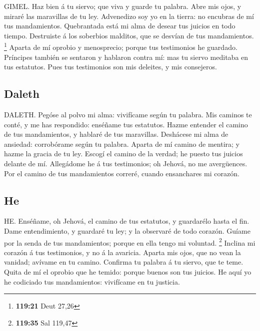  GIMEL. Haz bien á tu siervo; que viva y guarde tu palabra.
 Abre mis ojos, y miraré las maravillas de tu ley.
 Advenedizo soy yo en la tierra: no encubras de mí tus
mandamientos.  Quebrantada está mi alma de desear tus
juicios en todo tiempo.  Destruiste á los soberbios
malditos, que se desvían de tus mandamientos. \footnote{\textbf{119:21}
  Deut 27,26}  Aparta de mí oprobio y menosprecio; porque
tus testimonios he guardado.  Príncipes también se sentaron
y hablaron contra mí: mas tu siervo meditaba en tus estatutos.
 Pues tus testimonios son mis deleites, y mis consejeros.

\hypertarget{daleth}{%
\subsection{Daleth}\label{daleth}}

 DALETH. Pegóse al polvo mi alma: vivifícame según tu
palabra.  Mis caminos te conté, y me has respondido:
enséñame tus estatutos.  Hazme entender el camino de tus
mandamientos, y hablaré de tus maravillas.  Deshácese mi
alma de ansiedad: corrobórame según tu palabra.  Aparta de
mí camino de mentira; y hazme la gracia de tu ley.  Escogí
el camino de la verdad; he puesto tus juicios delante de mí.
 Allegádome he á tus testimonios; oh Jehová, no me
avergüences.  Por el camino de tus mandamientos correré,
cuando ensanchares mi corazón.

\hypertarget{he}{%
\subsection{He}\label{he}}

 HE. Enséñame, oh Jehová, el camino de tus estatutos, y
guardarélo hasta el fin.  Dame entendimiento, y guardaré tu
ley; y la observaré de todo corazón.  Guíame por la senda
de tus mandamientos; porque en ella tengo mi voluntad. \footnote{\textbf{119:35}
  Sal 119,47}  Inclina mi corazón á tus testimonios, y no á
la avaricia.  Aparta mis ojos, que no vean la vanidad;
avívame en tu camino.  Confirma tu palabra á tu siervo, que
te teme.  Quita de mí el oprobio que he temido: porque
buenos son tus juicios.  He aquí yo he codiciado tus
mandamientos: vivifícame en tu justicia.

